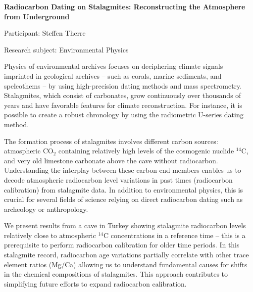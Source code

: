 \begin{minipage}[t]{1.0\textwidth}

\begin{center}

{{\large\bfseries Radiocarbon Dating on Stalagmites: Reconstructing the Atmosphere from Underground}\par}

\end{center}

{\noindent Participant: Steffen Therre\par} 

{\noindent Research subject: Environmental Physics\par}\medskip

\noindent Physics of environmental archives focuses on deciphering climate signals imprinted in geological archives – such as corals, marine sediments, and speleothems – by using high-precision dating methods and mass spectrometry. Stalagmites, which consist of carbonates, grow continuously over thousands of years and have favorable features for climate reconstruction. For instance, it is possible to create a robust chronology by using the radiometric U-series dating method. 
	
The formation process of stalagmites involves different carbon sources: atmospheric CO$ _2 $ containing relatively high levels of the cosmogenic  nuclide $^{14}$C, and very old limestone carbonate above the cave without radiocarbon. Understanding the interplay between these carbon end-members enables us to decode atmospheric radiocarbon level variations in past times (radiocarbon calibration) from stalagmite data. In addition to environmental physics, this is crucial for several fields of science relying on direct radiocarbon dating such as archeology or anthropology.
	
We present results from a cave in Turkey showing stalagmite radiocarbon levels relatively close to atmospheric $^{14}$C concentrations in a reference time – this is a prerequisite to perform radiocarbon calibration for older time periods. In this stalagmite record, radiocarbon age variations partially correlate with other trace element ratios (Mg/Ca) allowing us to understand fundamental causes for shifts in the chemical compositions of stalagmites. This approach contributes to simplifying future efforts to expand radiocarbon calibration.\par\end{minipage}

\hfill 

